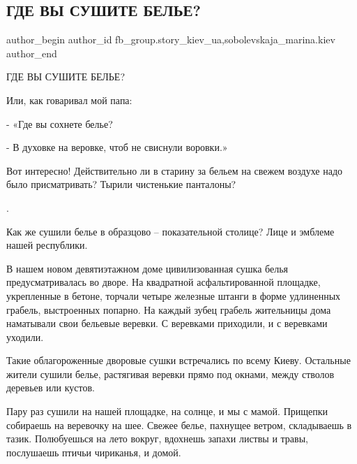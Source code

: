  
 
 
 
 
 
\subsection{ГДЕ ВЫ СУШИТЕ БЕЛЬЕ?}
\label{sec:23_12_2021.fb.fb_group.story_kiev_ua.1.gde_vy_sushite_belje}
 
\ifcmt
 author_begin
   author_id fb_group.story_kiev_ua,sobolevskaja_marina.kiev
 author_end
\fi

\begin{multicols}{2} %
\setlength{\parindent}{0pt}

ГДЕ ВЫ СУШИТЕ БЕЛЬЕ?

Или, как говаривал мой папа:

- «Где вы сохнете белье?

- В духовке на веровке, чтоб не свиснули воровки.»

Вот интересно! Действительно ли в старину за бельем на свежем воздухе надо было
присматривать? Тырили чистенькие панталоны?

.

Как же сушили белье в образцово – показательной столице? Лице и эмблеме нашей
республики. 

В нашем новом девятиэтажном доме цивилизованная сушка белья предусматривалась
во дворе. На квадратной асфальтированной площадке, укрепленные в бетоне,
торчали четыре железные штанги в форме удлиненных грабель, выстроенных попарно.
На каждый зубец грабель жительницы дома наматывали свои бельевые веревки. С
веревками приходили, и с веревками уходили. 

Такие облагороженные дворовые сушки встречались по всему Киеву. Остальные
жители сушили белье, растягивая веревки прямо под окнами, между стволов
деревьев или кустов.

Пару раз сушили на нашей площадке, на солнце, и мы с мамой. Прищепки собираешь
на веревочку на шее. Свежее белье, пахнущее ветром, складываешь в тазик.
Полюбуешься на лето вокруг, вдохнешь запахи листвы и травы, послушаешь птичьи
чириканья, и домой. 



\end{multicols} %

